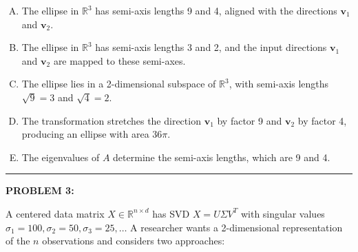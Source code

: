 \documentclass[12pt]{amsart}
\newcommand{\divider}{
  \vspace{-1em} %
  \noindent
  \raisebox{-0.15ex}{\textbullet}%
  \hspace{0.5em}%
  \rule[0.5ex]{0.95\textwidth}{1.0pt}%
  \hspace{0.5em}%
  \raisebox{-0.15ex}{\textbullet}%
  \vspace{0em} %
}
\begin{document}
\begin{enumerate}[(A)]
\item The ellipse in $\mathbb{R}^3$ has semi-axis lengths 9 and 4, aligned with the directions $\mathbf{v}_1$ and $\mathbf{v}_2$.
\item The ellipse in $\mathbb{R}^3$ has semi-axis lengths 3 and 2, and the input directions $\mathbf{v}_1$ and $\mathbf{v}_2$ are mapped to these semi-axes.
\item The ellipse lies in a 2-dimensional subspace of $\mathbb{R}^3$, with semi-axis lengths $\sqrt{9} = 3$ and $\sqrt{4} = 2$.
\item The transformation stretches the direction $\mathbf{v}_1$ by factor 9 and $\mathbf{v}_2$ by factor 4, producing an ellipse with area $36\pi$.
\item The eigenvalues of $A$ determine the semi-axis lengths, which are 9 and 4.
\end{enumerate}


\divider


{\bf PROBLEM 3:}

A centered data matrix $X \in \mathbb{R}^{n \times d}$ has SVD $X = U\Sigma V^T$ with singular values $\sigma_1 = 100, \sigma_2 = 50, \sigma_3 = 25, \ldots$ A researcher wants a 2-dimensional representation of the $n$ observations and considers two approaches:
\end{document}
